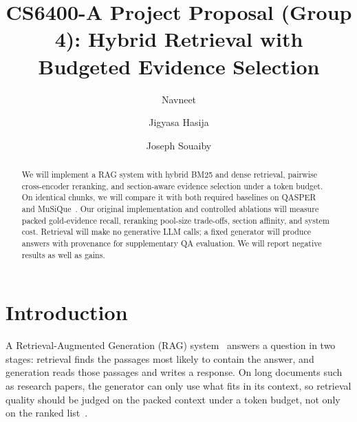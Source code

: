 \documentclass[sigconf, nonacm]{acmart}
\begin{document}
\title{CS6400-A Project Proposal (Group 4): Hybrid Retrieval with Budgeted Evidence Selection}

\author{Navneet}

\author{Jigyasa Hasija}

\author{Joseph Souaiby}

\begin{abstract}
We will implement a RAG system with hybrid BM25 and dense retrieval, pairwise cross-encoder reranking, and section-aware evidence selection under a token budget. On identical chunks, we will compare it with both required baselines on QASPER~\cite{dasigi2021qasper} and MuSiQue~\cite{trivedi2022musique}. Our original implementation and controlled ablations will measure packed gold-evidence recall, reranking pool-size trade-offs, section affinity, and system cost. Retrieval will make no generative LLM calls; a fixed generator will produce answers with provenance for supplementary QA evaluation. We will report negative results as well as gains.
\end{abstract}

\maketitle

\section{Introduction}

A Retrieval-Augmented Generation (RAG) system~\cite{lewis2020rag} answers a question in two stages: retrieval finds the passages most likely to contain the answer, and generation reads those passages and writes a response. On long documents such as research papers, the generator can only use what fits in its context, so retrieval quality should be judged on the packed context under a token budget, not only on the ranked list~\cite{bala2026recall}.
\end{document}
